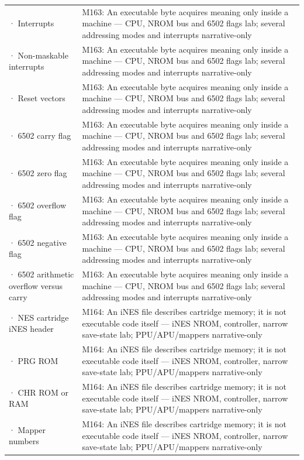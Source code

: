 {\begin{longtable}[]{@{}
  >{\raggedright\arraybackslash}p{}
  >{\raggedright\arraybackslash}p{}@{}}
2721 · Interrupts & M163: An executable byte acquires meaning only inside a machine --- CPU, NROM bus and 6502 flags lab; several addressing modes and interrupts narrative-only \\
2722 · Non-maskable interrupts & M163: An executable byte acquires meaning only inside a machine --- CPU, NROM bus and 6502 flags lab; several addressing modes and interrupts narrative-only \\
2723 · Reset vectors & M163: An executable byte acquires meaning only inside a machine --- CPU, NROM bus and 6502 flags lab; several addressing modes and interrupts narrative-only \\
2724 · 6502 carry flag & M163: An executable byte acquires meaning only inside a machine --- CPU, NROM bus and 6502 flags lab; several addressing modes and interrupts narrative-only \\
2725 · 6502 zero flag & M163: An executable byte acquires meaning only inside a machine --- CPU, NROM bus and 6502 flags lab; several addressing modes and interrupts narrative-only \\
2726 · 6502 overflow flag & M163: An executable byte acquires meaning only inside a machine --- CPU, NROM bus and 6502 flags lab; several addressing modes and interrupts narrative-only \\
2727 · 6502 negative flag & M163: An executable byte acquires meaning only inside a machine --- CPU, NROM bus and 6502 flags lab; several addressing modes and interrupts narrative-only \\
2728 · 6502 arithmetic overflow versus carry & M163: An executable byte acquires meaning only inside a machine --- CPU, NROM bus and 6502 flags lab; several addressing modes and interrupts narrative-only \\
2729 · NES cartridge iNES header & M164: An iNES file describes cartridge memory; it is not executable code itself --- iNES NROM, controller, narrow save-state lab; PPU/APU/mappers narrative-only \\
2730 · PRG ROM & M164: An iNES file describes cartridge memory; it is not executable code itself --- iNES NROM, controller, narrow save-state lab; PPU/APU/mappers narrative-only \\
2731 · CHR ROM or RAM & M164: An iNES file describes cartridge memory; it is not executable code itself --- iNES NROM, controller, narrow save-state lab; PPU/APU/mappers narrative-only \\
2732 · Mapper numbers & M164: An iNES file describes cartridge memory; it is not executable code itself --- iNES NROM, controller, narrow save-state lab; PPU/APU/mappers narrative-only \\

\end{longtable}}
